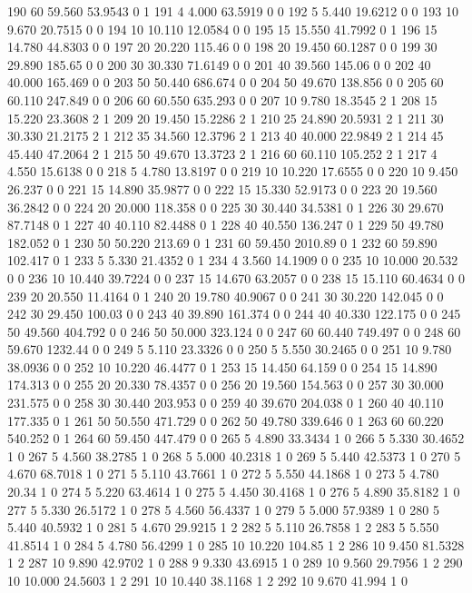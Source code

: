 {190 60 59.560 53.9543 0 1
191 4 4.000 63.5919 0 0
192 5 5.440 19.6212 0 0
193 10 9.670 20.7515 0 0
194 10 10.110 12.0584 0 0
195 15 15.550 41.7992 0 1
196 15 14.780 44.8303 0 0
197 20 20.220 115.46 0 0
198 20 19.450 60.1287 0 0
199 30 29.890 185.65 0 0
200 30 30.330 71.6149 0 0
201 40 39.560 145.06 0 0
202 40 40.000 165.469 0 0
203 50 50.440 686.674 0 0
204 50 49.670 138.856 0 0
205 60 60.110 247.849 0 0
206 60 60.550 635.293 0 0
207 10 9.780 18.3545 2 1
208 15 15.220 23.3608 2 1
209 20 19.450 15.2286 2 1
210 25 24.890 20.5931 2 1
211 30 30.330 21.2175 2 1
212 35 34.560 12.3796 2 1
213 40 40.000 22.9849 2 1
214 45 45.440 47.2064 2 1
215 50 49.670 13.3723 2 1
216 60 60.110 105.252 2 1
217 4 4.550 15.6138 0 0
218 5 4.780 13.8197 0 0
219 10 10.220 17.6555 0 0
220 10 9.450 26.237 0 0
221 15 14.890 35.9877 0 0
222 15 15.330 52.9173 0 0
223 20 19.560 36.2842 0 0
224 20 20.000 118.358 0 0
225 30 30.440 34.5381 0 1
226 30 29.670 87.7148 0 1
227 40 40.110 82.4488 0 1
228 40 40.550 136.247 0 1
229 50 49.780 182.052 0 1
230 50 50.220 213.69 0 1
231 60 59.450 2010.89 0 1
232 60 59.890 102.417 0 1
233 5 5.330 21.4352 0 1
234 4 3.560 14.1909 0 0
235 10 10.000 20.532 0 0
236 10 10.440 39.7224 0 0
237 15 14.670 63.2057 0 0
238 15 15.110 60.4634 0 0
239 20 20.550 11.4164 0 1
240 20 19.780 40.9067 0 0
241 30 30.220 142.045 0 0
242 30 29.450 100.03 0 0
243 40 39.890 161.374 0 0
244 40 40.330 122.175 0 0
245 50 49.560 404.792 0 0
246 50 50.000 323.124 0 0
247 60 60.440 749.497 0 0
248 60 59.670 1232.44 0 0
249 5 5.110 23.3326 0 0
250 5 5.550 30.2465 0 0
251 10 9.780 38.0936 0 0
252 10 10.220 46.4477 0 1
253 15 14.450 64.159 0 0
254 15 14.890 174.313 0 0
255 20 20.330 78.4357 0 0
256 20 19.560 154.563 0 0
257 30 30.000 231.575 0 0
258 30 30.440 203.953 0 0
259 40 39.670 204.038 0 1
260 40 40.110 177.335 0 1
261 50 50.550 471.729 0 0
262 50 49.780 339.646 0 1
263 60 60.220 540.252 0 1
264 60 59.450 447.479 0 0
265 5 4.890 33.3434 1 0
266 5 5.330 30.4652 1 0
267 5 4.560 38.2785 1 0
268 5 5.000 40.2318 1 0
269 5 5.440 42.5373 1 0
270 5 4.670 68.7018 1 0
271 5 5.110 43.7661 1 0
272 5 5.550 44.1868 1 0
273 5 4.780 20.34 1 0
274 5 5.220 63.4614 1 0
275 5 4.450 30.4168 1 0
276 5 4.890 35.8182 1 0
277 5 5.330 26.5172 1 0
278 5 4.560 56.4337 1 0
279 5 5.000 57.9389 1 0
280 5 5.440 40.5932 1 0
281 5 4.670 29.9215 1 2
282 5 5.110 26.7858 1 2
283 5 5.550 41.8514 1 0
284 5 4.780 56.4299 1 0
285 10 10.220 104.85 1 2
286 10 9.450 81.5328 1 2
287 10 9.890 42.9702 1 0
288 9 9.330 43.6915 1 0
289 10 9.560 29.7956 1 2
290 10 10.000 24.5603 1 2
291 10 10.440 38.1168 1 2
292 10 9.670 41.994 1 0
}
